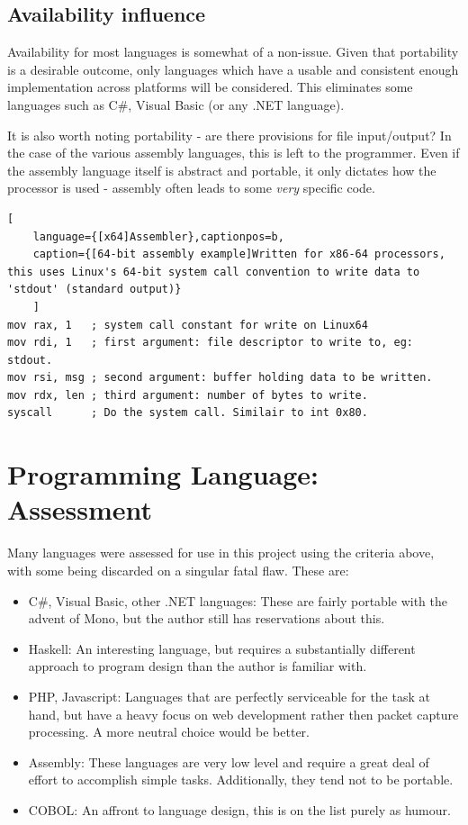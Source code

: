 \documentclass[10pt,a4paper,notitlepage]{report}
\begin{document}
\subsection{Availability influence}
Availability for most languages is somewhat of a non-issue. Given that portability is a desirable outcome, only languages which have a usable and consistent enough implementation across platforms will be considered. This eliminates some languages such as C\#, Visual Basic (or any .NET language).

It is also worth noting portability - are there provisions for file input/output? In the case of the various assembly languages, this is left to the programmer. Even if the assembly language itself is abstract and portable, it only dictates how the processor is used - assembly often leads to some \emph{very} specific code.

\begin{lstlisting}[
	language={[x64]Assembler},captionpos=b,
	caption={[64-bit assembly example]Written for x86-64 processors, this uses Linux's 64-bit system call convention to write data to 'stdout' (standard output)}
	]
mov rax, 1   ; system call constant for write on Linux64
mov rdi, 1   ; first argument: file descriptor to write to, eg: stdout.
mov rsi, msg ; second argument: buffer holding data to be written.
mov rdx, len ; third argument: number of bytes to write.
syscall      ; Do the system call. Similair to int 0x80.
\end{lstlisting}

\section{Programming Language: Assessment}
Many languages were assessed for use in this project using the criteria above, with some being discarded on a singular fatal flaw. These are:
\begin{itemize}
\item C\#, Visual Basic, other .NET languages: These are fairly portable with the advent of Mono\cite{mono}, but the author still has reservations about this.
\item Haskell: An interesting language, but requires a substantially different approach to program design than the author is familiar with.
\item PHP, Javascript: Languages that are perfectly serviceable for the task at hand, but have a heavy focus on web development rather then packet capture processing. A more neutral choice would be better.
\item Assembly: These languages are very low level and require a great deal of effort to accomplish simple tasks. Additionally, they tend not to be portable.
\item COBOL: An affront to language design, this is on the list purely as humour.
\end{itemize}
\end{document}
